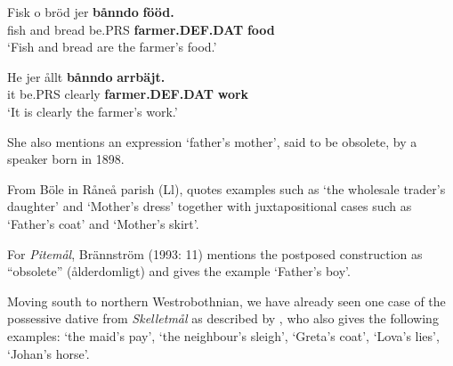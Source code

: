 
 \ea\label{}
\gll Fisk  o  bröd  jer  \textbf{bånndo} \textbf{fööd.}\\


fish  and  bread  be.PRS  \textbf{farmer.DEF.DAT} \textbf{food}\\

\glt ‘Fish and bread are the farmer’s food.’

\z

\item 


 \ea\label{}
\gll He  jer  ållt  \textbf{bånndo} \textbf{arrbäjt.}\\


it  be.PRS  clearly  \textbf{farmer.DEF.DAT} \textbf{work}\\

\glt ‘It is clearly the farmer’s work.’

\z

She also mentions an expression  ‘father’s mother’, said to be obsolete, by a speaker born in 1898.


From Böle in Råneå parish (Ll), \citet[113]{Wikberg2004} quotes examples such as  ‘the wholesale trader’s daughter’ and  ‘Mother’s dress’ together with juxtapositional cases such as  ‘Father’s coat’ and  ‘Mother’s skirt’.


For \textit{Pitemål}, Brännström (1993: 11) mentions the postposed construction as “obsolete” (ålderdomligt) and gives the example  ‘Father’s boy’. 


Moving south to northern Westrobothnian, we have already seen one case of the possessive dative from \textit{Skelletmål} as described by \citet[22]{Marklund1976}, who also gives the following examples:  ‘the maid’s pay’,  ‘the neighbour’s sleigh’,  ‘Greta’s coat’,  ‘Lova’s lies’, ‘Johan’s horse’. 

